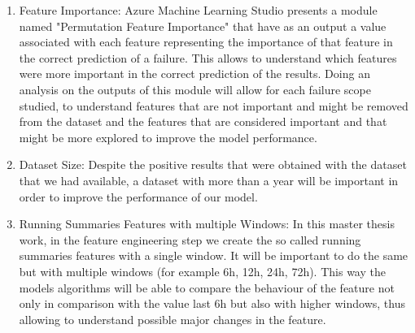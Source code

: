 \begin{enumerate}
    \item{Feature Importance:}
Azure Machine Learning Studio presents a module named "Permutation Feature Importance" that have as an output a value associated with each feature representing the importance of that feature in the correct prediction of a failure. This allows to understand which features were more important in the correct prediction of the results. Doing an analysis on the outputs of this module will allow for each failure scope studied, to understand features that are not important and might be removed from the dataset and the features that are considered important and that might be more explored to improve the model performance.
    \item{Dataset Size:}
Despite the positive results that were obtained with the dataset that we had available, a dataset with more than a year will be important in order to improve the performance of our model.
    \item{Running Summaries Features with multiple Windows:}
In this master thesis work, in the feature engineering step we create the so called running summaries features with a single window. It will be important to do the same but with multiple windows (for example 6h, 12h, 24h, 72h). This way the models algorithms will be able to compare the behaviour of the feature not only in comparison with the value last 6h but also with higher windows, thus allowing to understand possible major changes in the feature.
\end{enumerate} 